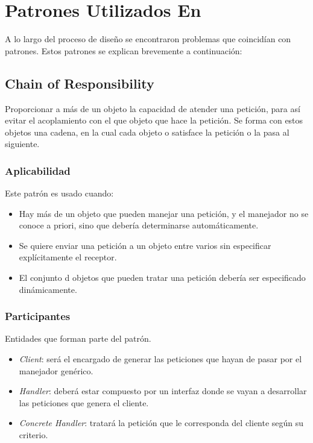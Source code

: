 	\section{Patrones Utilizados En \rc{}}
        A lo largo del proceso de diseño se encontraron problemas que coincidían con patrones. Estos patrones se
        explican brevemente a continuación:

        \subsection{Chain of Responsibility}\label{chain_pattern}
Proporcionar a más de un objeto la capacidad de atender una petición, para así evitar el acoplamiento con el que objeto
que hace la petición. Se forma con estos objetos una cadena, en la cual cada objeto o satisface la petición o la pasa al
siguiente.



    \subsubsection{Aplicabilidad}
        Este patrón es usado cuando:
        \begin{itemize}
            \item Hay más de un objeto que pueden manejar una petición, y el manejador no se conoce a priori, sino que
                debería determinarse automáticamente.
            \item Se quiere enviar una petición a un objeto entre varios sin especificar explícitamente el receptor.
            \item El conjunto d objetos que pueden tratar una petición debería ser especificado dinámicamente.
        \end{itemize}

    \subsubsection{Participantes}
        Entidades que forman parte del patrón.
        \begin{itemize}
            \item \textit{Client}: será el encargado de generar las peticiones que hayan de pasar por el manejador
                genérico.
            \item \textit{Handler}: deberá  estar  compuesto  por  un  interfaz  donde  se vayan a desarrollar las
                    peticiones que genera el cliente.
            \item \textit{Concrete Handler}: tratará  la  petición  que  le  corresponda del cliente según su criterio.
        \end{itemize}

